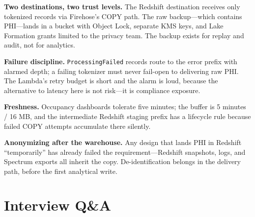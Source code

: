 \textbf{Two destinations, two trust levels.} The Redshift destination receives only tokenized records via Firehose's COPY path. The raw backup---which contains PHI---lands in a bucket with Object Lock, separate KMS keys, and Lake Formation grants limited to the privacy team. The backup exists for replay and audit, not for analytics.

\textbf{Failure discipline.} \texttt{ProcessingFailed} records route to the error prefix with alarmed depth; a failing tokenizer must never fail-open to delivering raw PHI. The Lambda's retry budget is short and the alarm is loud, because the alternative to latency here is not risk---it is compliance exposure.

\textbf{Freshness.} Occupancy dashboards tolerate five minutes; the buffer is 5 minutes / 16 MB, and the intermediate Redshift staging prefix has a lifecycle rule because failed COPY attempts accumulate there silently.

\begin{pitfall}
\textbf{Anonymizing after the warehouse.} Any design that lands PHI in Redshift ``temporarily'' has already failed the requirement---Redshift snapshots, logs, and Spectrum exports all inherit the copy. De-identification belongs in the delivery path, before the first analytical write.
\end{pitfall}

\section{Interview Q\&A}
